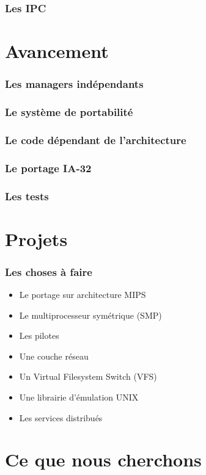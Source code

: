\begin{frame}
  \frametitle{Les IPC}

\end{frame}

%
%

\section{Avancement}

\begin{frame}
  \frametitle{Les managers ind\'{e}pendants}

\end{frame}

\begin{frame}
  \frametitle{Le syst\`{e}me de portabilit\'{e}}

\end{frame}

\begin{frame}
  \frametitle{Le code d\'{e}pendant de l'architecture}

\end{frame}

\begin{frame}
  \frametitle{Le portage IA-32}

\end{frame}

\begin{frame}
  \frametitle{Les tests}

\end{frame}

%
%

\section{Projets}

\begin{frame}
  \frametitle{Les choses \`{a} faire}

  \begin{itemize}
  \item
    Le portage sur architecture MIPS
  \item
    Le multiprocesseur sym\'{e}trique (SMP)
  \item
    Les pilotes
  \item
    Une couche r\'{e}seau
  \item
    Un Virtual Filesystem Switch (VFS)
  \item
    Une librairie d'\'{e}mulation UNIX
  \item
    Les services distribu\'{e}s
  \end{itemize}

\end{frame}

%
%

\section{Ce que nous cherchons}


